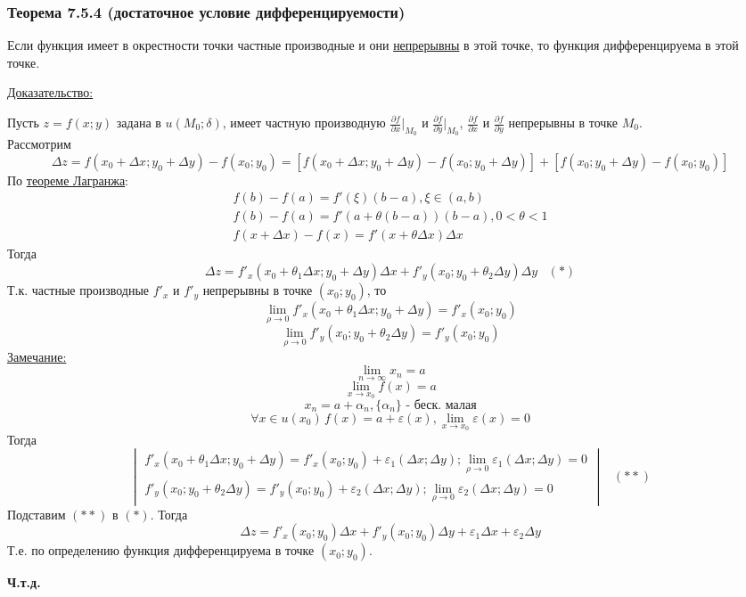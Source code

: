 \documentclass[12pt]{article}
\begin{document}
    \subsubsection*{Теорема 7.5.4 (достаточное условие дифференцируемости)}\label{th:7.5.4}
    Если функция имеет в окрестности точки частные производные и они \underline{непрерывны} в этой точке, то функция дифференцируема в этой точке.\par\noindent
    \underline{Доказательство:}
    \begin{adjustwidth}{1.5em}{1.5em}
        Пусть $z = f(x;y)$ задана в $u(M_0; \delta)$, имеет частную производную $\frac{\partial f}{\partial x} \Big|_{M_0}$ и $\frac{\partial f}{\partial y} \Big|_{M_0}$, $\frac{\partial f}{\partial x}$ и $\frac{\partial f}{\partial y}$ непрерывны в точке $M_0$.\\
        Рассмотрим
        \[ \Delta z = f(x_0 + \Delta x; y_0 + \Delta y) - f(x_0; y_0) = [ f(x_0 + \Delta x; y_0 + \Delta y) - f(x_0; y_0 + \Delta y) ] + [f(x_0; y_0 + \Delta y) - f(x_0; y_0)] \]
        По \hyperref[th:4.12.4]{теореме Лагранжа}:
        \begin{gather*}
            f(b) - f(a) = f'(\xi)(b-a), \xi \in (a, b)\\
            f(b) - f(a) = f'(a + \theta(b-a))(b-a), 0 < \theta < 1\\
            f(x + \Delta x) - f(x) = f'(x + \theta \Delta x) \Delta x
        \end{gather*}
        Тогда
        \[ \Delta z = f'_x (x_0 + \theta_1 \Delta x; y_0 + \Delta y)\Delta x + f'_y(x_0; y_0 + \theta_2 \Delta y)\Delta y\,\,\,\,\, (*) \]
        Т.к. частные производные $f'_x$ и $f'_y$ непрерывны в точке $(x_0; y_0)$, то
        \[ \lim_{\rho \to 0} f'_x(x_0 + \theta_1 \Delta x; y_0 + \Delta y) = f'_x(x_0; y_0) \]
        \[ \lim_{\rho \to 0} f'_y(x_0; y_0 + \theta_2 \Delta y) = f'_y(x_0; y_0) \]
        \underline{Замечание:}
        \[ \lim_{n\to\infty} x_n = a \]
        \[ \lim_{x \to x_0} f(x) = a \]
        \[ x_n = a + \alpha_n, \{ \alpha_n \}\text{ - беск. малая} \]
        \[ \forall x \in u(x_0)\, f(x) = a + \varepsilon(x), \lim_{x\to x_0} \varepsilon(x) = 0 \]
        Тогда
        \[ \begin{vmatrix}
            f'_x(x_0 + \theta_1 \Delta x; y_0 + \Delta y) = f'_x (x_0; y_0) + \varepsilon_1 (\Delta x; \Delta y); \lim_{\rho \to 0} \varepsilon_1(\Delta x; \Delta y) = 0\\
            f'_y(x_0; y_0 + \theta_2 \Delta y) = f'_y (x_0; y_0) + \varepsilon_2 (\Delta x; \Delta y); \lim_{\rho \to 0} \varepsilon_2(\Delta x; \Delta y) = 0
        \end{vmatrix} \,\,\,\,\, (**) \]
        Подставим $(**)$ в $(*)$. Тогда
        \[ \Delta z = f'_x(x_0; y_0)\Delta x + f'_y(x_0; y_0)\Delta y + \varepsilon_1\Delta x + \varepsilon_2 \Delta y \]
        Т.е. по определению функция дифференцируема в точке $(x_0; y_0)$.
        \begin{center}
            \textbf{Ч.т.д.}
        \end{center}
    \end{adjustwidth}
\end{document}
